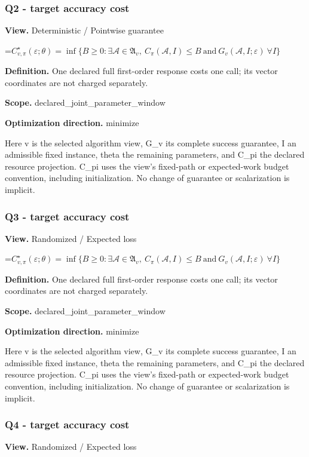 \documentclass[10pt,a4paper]{article}
\newcommand{\AtlasMath}[1]{\par\begingroup\centering\setbox0=\hbox{$\displaystyle #1$}\ifdim\wd0>1.4\linewidth\typeout{ATLAS WIDE FORMULA: \the\wd0}\fi\ifdim\wd0>\linewidth\resizebox{\linewidth}{!}{\box0}\else\box0\fi\par\endgroup}
\begin{document}
\subsubsection{Q2 - target accuracy cost}
\textbf{View.} Deterministic / Pointwise guarantee

\AtlasMath{C^\star_{v,\pi}(\varepsilon;\theta)=\inf\{B\ge0:\exists\mathcal A\in\mathfrak A_v,\ C_\pi(\mathcal A,I)\le B\ \text{and}\ G_v(\mathcal A,I;\varepsilon)\ \forall I\}}
\textbf{Definition.} One declared full first-order response costs one call; its vector coordinates are not charged separately.

\textbf{Scope.} declared\_joint\_parameter\_window

\textbf{Optimization direction.} minimize

Here v is the selected algorithm view, G\_v its complete success guarantee, I an admissible fixed instance, theta the remaining parameters, and C\_pi the declared resource projection. C\_pi uses the view's fixed-path or expected-work budget convention, including initialization. No change of guarantee or scalarization is implicit.

\subsubsection{Q3 - target accuracy cost}
\textbf{View.} Randomized / Expected loss

\AtlasMath{C^\star_{v,\pi}(\varepsilon;\theta)=\inf\{B\ge0:\exists\mathcal A\in\mathfrak A_v,\ C_\pi(\mathcal A,I)\le B\ \text{and}\ G_v(\mathcal A,I;\varepsilon)\ \forall I\}}
\textbf{Definition.} One declared full first-order response costs one call; its vector coordinates are not charged separately.

\textbf{Scope.} declared\_joint\_parameter\_window

\textbf{Optimization direction.} minimize

Here v is the selected algorithm view, G\_v its complete success guarantee, I an admissible fixed instance, theta the remaining parameters, and C\_pi the declared resource projection. C\_pi uses the view's fixed-path or expected-work budget convention, including initialization. No change of guarantee or scalarization is implicit.

\subsubsection{Q4 - target accuracy cost}
\textbf{View.} Randomized / Expected loss
\end{document}

